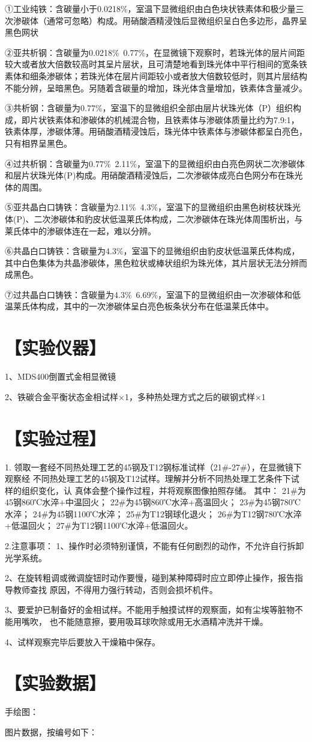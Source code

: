 \documentclass[a4paper,utf8]{article}
\begin{document}
\begin{enumerate}
    ①工业纯铁：含碳量小于0.0218\%，室温下显微组织由白色块状铁素体和极少量三次渗碳体（通常可忽略）构成。用硝酸酒精浸蚀后显微组织呈白色多边形，晶界呈黑色网状

    ②亚共析钢：含碳量为0.0218\%~0.77\%，在显微镜下观察时，若珠光体的层片间距较大或者放大倍数较高时其呈片层状，且可清楚地看到珠光体中平行相间的宽条铁素体和细条渗碳体；若珠光体在层片间距较小或者放大倍数较低时，则其片层结构不能分辨，呈暗黑色。另随着含碳量的增加，珠光体含量增加，铁素体含量减少。
    
    ③共析钢：含碳量为0.77\%，室温下的显微组织全部由层片状珠光体（P）组织构成，即片状铁素体和渗碳体的机械混合物，且铁素体与渗碳体质量比约为7.9:1，铁素体厚，渗碳体薄。用硝酸酒精浸蚀后，珠光体中铁素体与渗碳体都呈白亮色，只有相界呈黑色。
    
    ④过共析钢：含碳量为0.77\%~2.11\%，室温下的显微组织由白亮色网状二次渗碳体和层片状珠光体(P)构成。用硝酸酒精浸蚀后，二次渗碳体成亮白色网分布在珠光体的周围。
    
    ⑤亚共晶白口铸铁：含碳量为2.11\%~4.3\%，室温下的显微组织由黑色树枝状珠光体(P)、二次渗碳体和豹皮状低温莱氏体构成，二次渗碳体在珠光体周围析出，与莱氏体中的渗碳体连在一起，难以分辨。
    
    ⑥共晶白口铸铁：含碳量为4.3\%，室温下的显微组织由豹皮状低温莱氏体构成，其中白色集体为共晶渗碳体，黑色粒状或棒状组织为珠光体，其片层状无法分辨而成黑色。
    
    ⑦过共晶白口铸铁：含碳量为4.3\%~6.69\%，室温下的显微组织由一次渗碳体和低温莱氏体构成，其中的一次渗碳体呈白亮色板条状分布在低温莱氏体中。
    \end{enumerate}



\section*{【实验仪器】}%
1、MDS400倒置式金相显微镜

2、铁碳合金平衡状态金相试样×1，多种热处理方式之后的碳钢式样×1
\section*{【实验过程】}%

1. 领取一套经不同热处理工艺的45钢及T12钢标准试样（21\#-27\#），在显微镜下观察经
不同热处理工艺的45钢及T12试样。理解并分析不同热处理工艺条件下试样的组织变化，认
真体会整个操作过程，并将观察图像拍照存储。
其中：
21\#为45钢860℃水淬+中温回火；
22\#为45钢860℃水淬+高温回火；
23\#为45钢780℃水淬；
24\#为45钢1100℃水淬；
25\#为T12钢球化退火；
26\#为T12钢780℃水淬+低温回火；
27\#为T12钢1100℃水淬+低温回火。

2.注意事项：
1、操作时必须特别谨慎，不能有任何剧烈的动作，不允许自行拆卸光学系统。

2、在旋转粗调或微调旋钮时动作要慢，碰到某种障碍时应立即停止操作，报告指导教师查找
原因，不得用力强行转动，否则会损坏机件。

3、要爱护已制备好的金相试样。不能用手触摸试样的观察面，如有尘埃等脏物不能用嘴吹，
也不能随意擦，要用吸耳球吹除或用无水酒精冲洗并干燥。

4、试样观察完毕后要放入干燥箱中保存。

\section*{【实验数据】}
手绘图：

图片数据，按编号如下：
\end{document}
